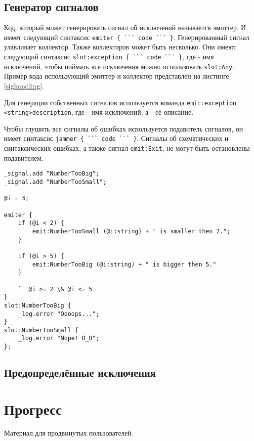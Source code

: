 \documentclass[a4paper, 14pt]{extarticle}
\begin{document}
\subsection{Генератор сигналов}

Код, который может генерировать сигнал об исключений называется эмиттер. И имеет следующий синтаксис \lstinline|emiter { ``` code ``` }|. Генерированный сигнал улавливает коллектор. Также коллекторов может быть несколько. Они имеют следующий синтаксис \lstinline|slot:exception { ``` code ``` }|,
где  - имя исключений, чтобы поймать все исключения можно использовать \lstinline|slot:Any|. Пример кода использующий эмиттер и коллектор представлен на листинге \ref{sighandling}.

Для генерации собственных сигналов используется команда \lstinline|emit:exception <string>description|, где  - имя исключений, а  - её описание.

Чтобы глушить все сигналы об ошибках используется подавитель сигналов, он имеет синтаксис \lstinline|jammer { ``` code ``` }|. Сигналы об схематических и синтаксических ошибках, а также сигнал \lstinline|emit:Exit|, не могут быть остановлены подавителем.

\begin{lstlisting}[caption=Обработка инключении, label=sighandling]
_signal.add "NumberTooBig";
_signal.add "NumberTooSmall";

@i = 3;

emiter {
	if (@i < 2) {
		emit:NumberTooSmall (@i:string) + " is smaller then 2.";
	}
	
	if (@i > 5) {
		emit:NumberTooBig (@i:string) + " is bigger then 5."
	}

	`` @i >= 2 \& @i <= 5
}
slot:NumberTooBig {
	_log.error "Oooops...";
}
slot:NumberTooSmall {
	_log.error "Nope! O_O";
};
\end{lstlisting}

\subsection{Предопределённые исключения}

\newpage
\section{Прогресс}

{\color{red}Материал для продвинутых пользователей.}
\end{document}
